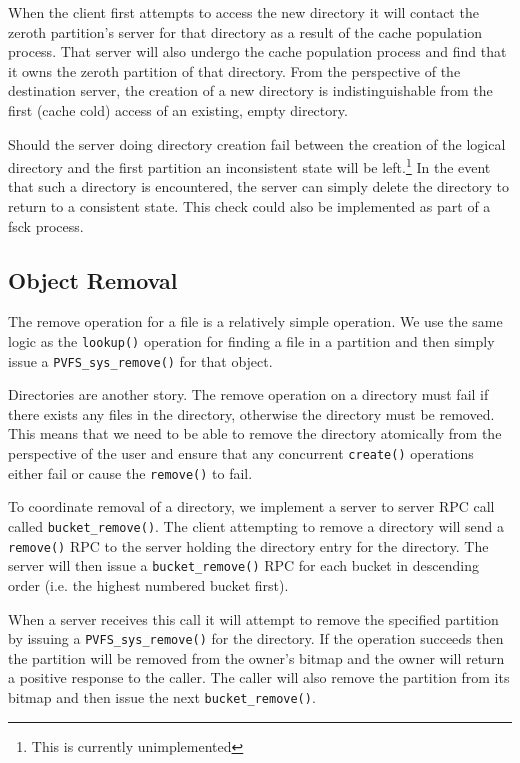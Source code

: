 \documentclass[twocolumn,letterpaper]{article}
\newcommand{\code}[1]{\texttt{#1}}
\begin{document}
When the client first attempts to access the new directory it will contact the
zeroth partition's server for that directory as a result of the cache
population process.  That server will also undergo the cache population
process and find that it owns the zeroth partition of that directory.  From
the perspective of the destination server, the creation of a new directory is
indistinguishable from the first (cache cold) access of an existing, empty
directory.

Should the server doing directory creation fail between the creation of the
logical directory and the first partition an inconsistent state will be
left.\footnote{This is currently unimplemented}  In the event that such a
directory is encountered, the server can simply delete the directory to return
to a consistent state.  This check could also be implemented as part of a fsck
process.

\subsection{Object Removal}
The remove operation for a file is a relatively simple operation.  We use the
same logic as the \code{lookup()} operation for finding a file in a partition
and then simply issue a \code{PVFS\_\-sys\_\-remove()} for that object.

Directories are another story.  The remove operation on a directory must fail if
there exists any files in the directory, otherwise the directory must be
removed.  This means that we need to be able to remove the directory
atomically from the perspective of the user and ensure that any concurrent
\code{create()} operations either fail or cause the \code{remove()} to fail.

To coordinate removal of a directory, we implement a server to server RPC call
called \code{bucket\_\-remove()}.  The client attempting to remove a directory will send a
\code{remove()} RPC to the server holding the directory entry for the directory.  The
server will then issue a \code{bucket\_\-remove()} RPC for each bucket in descending order
(i.e. the highest numbered bucket first).  

When a server receives this call it will attempt to remove the specified
partition by issuing a \code{PVFS\_\-sys\_\-remove()} for the directory.  If the operation
succeeds then the partition will be removed from the owner's bitmap and the
owner will return a positive response to the caller.  The caller will also
remove the partition from its bitmap and then issue the next
\code{bucket\_\-remove()}.
\end{document}
